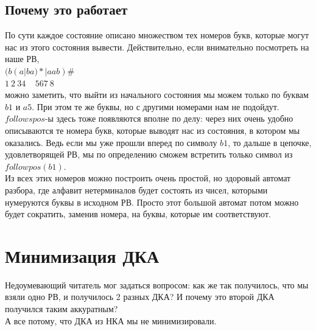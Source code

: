 \documentclass[14pt]{extreport}
\begin{document}
	\section{Почему это работает}
	По сути каждое состояние описано множеством тех номеров букв, которые могут нас из
	этого состояния вывести. Действительно, если внимательно посмотреть на наше РВ,\\
	$(b(a|ba)*|aab)\#$\\
	\hspace*{5pt}$1\ 2\ 34\ \ \ \ \ 567\ 8$\\
	можно заметить, что выйти из начального состояния мы можем только по буквам $b1$ и $a5$.
	При этом те же буквы, но с другими номерами нам не подойдут. $followspos$-ы здесь тоже
	появляются вполне по делу: через них очень удобно описываются те номера букв, которые выводят
	нас из состояния, в котором мы оказались. Ведь если мы уже прошли вперед по символу $b1$, то
	дальше в цепочке, удовлетворящей РВ, мы по определению сможем встретить только символ из
	$followpos(b1)$.\\
	Из всех этих номеров можно построить очень простой, но здоровый автомат разбора, где алфавит
	нетерминалов будет состоять из чисел, которыми нумеруются буквы в исходном РВ. Просто этот
	большой автомат потом можно будет сократить, заменив номера, на буквы, которые им
	соответствуют.
	\newpage
	\chapter{Минимизация ДКА}
	Недоумевающий читатель мог задаться вопросом: как же так получилось, что мы взяли
	одно РВ, и получилось 2 разных ДКА? И почему это второй ДКА получился таким аккуратным?\\
	А все потому, что ДКА из НКА мы не минимизировали.
\end{document}
